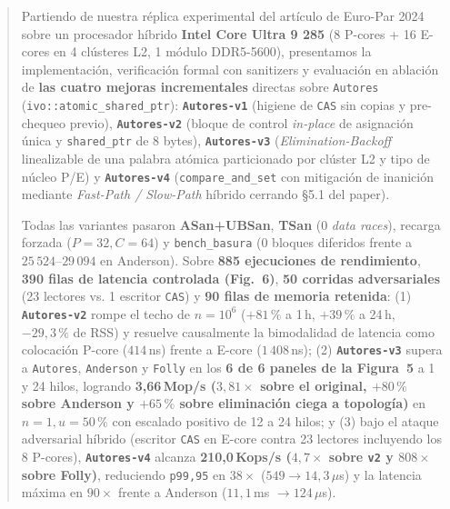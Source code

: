 \documentclass[11pt,a4paper]{article}
\begin{document}
\begin{abstract}
\noindent
Partiendo de nuestra réplica experimental del artículo de Euro-Par 2024~\cite{dewolff2024waitfree,dewolff2024artifact} sobre un procesador híbrido \textbf{Intel Core Ultra 9 285} (8 P-cores + 16 E-cores en 4 clústeres L2, 1 módulo DDR5-5600), presentamos la implementación, verificación formal con sanitizers y evaluación en ablación de \textbf{las cuatro mejoras incrementales} directas sobre \texttt{Autores} (\texttt{ivo::atomic\_shared\_ptr}): \textbf{\texttt{Autores-v1}} (higiene de \texttt{CAS} sin copias y pre-chequeo previo), \textbf{\texttt{Autores-v2}} (bloque de control \emph{in-place} de asignación única y \texttt{shared\_ptr} de 8 bytes), \textbf{\texttt{Autores-v3}} (\emph{Elimination-Backoff} linealizable de una palabra atómica particionado por clúster L2 y tipo de núcleo P/E) y \textbf{\texttt{Autores-v4}} (\texttt{compare\_and\_set} con mitigación de inanición mediante \emph{Fast-Path / Slow-Path} híbrido cerrando \S 5.1 del paper).

Todas las variantes pasaron \textbf{ASan+UBSan}, \textbf{TSan} (0 \emph{data races}), recarga forzada ($P=32, C=64$) y \texttt{bench\_basura} (0 bloques diferidos frente a $25\,524\text{--}29\,094$ en Anderson). Sobre \textbf{885 ejecuciones de rendimiento}, \textbf{390 filas de latencia controlada (Fig.~6)}, \textbf{50 corridas adversariales} (23 lectores vs. 1 escritor \texttt{CAS}) y \textbf{90 filas de memoria retenida}: (1) \textbf{\texttt{Autores-v2}} rompe el techo de $n=10^6$ ($+81\,\%$ a 1\,h, $+39\,\%$ a 24\,h, $-29{,}3\,\%$ de RSS) y resuelve causalmente la bimodalidad de latencia como colocación P-core ($414$\,ns) frente a E-core ($1\,408$\,ns); (2) \textbf{\texttt{Autores-v3}} supera a \texttt{Autores}, \texttt{Anderson} y \texttt{Folly} en los \textbf{6 de 6 paneles de la Figura~5} a 1 y 24 hilos, logrando \textbf{3{,}66\,Mop/s ($3{,}81\times$ sobre el original, $+80\,\%$ sobre Anderson y $+65\,\%$ sobre eliminación ciega a topología)} en $n=1, u=50\,\%$ con escalado positivo de 12 a 24 hilos; y (3) bajo el ataque adversarial híbrido (escritor \texttt{CAS} en E-core contra 23 lectores incluyendo los 8 P-cores), \textbf{\texttt{Autores-v4}} alcanza \textbf{210{,}0\,Kops/s ($4{,}7\times$ sobre \texttt{v2} y $808\times$ sobre Folly)}, reduciendo \texttt{p99,95} en \textbf{$38\times$} ($549 \to 14{,}3\,\mu$s) y la latencia máxima en \textbf{$90\times$} frente a Anderson ($11{,}1\,$ms $\to 124\,\mu$s).
\end{abstract}

\end{document}
